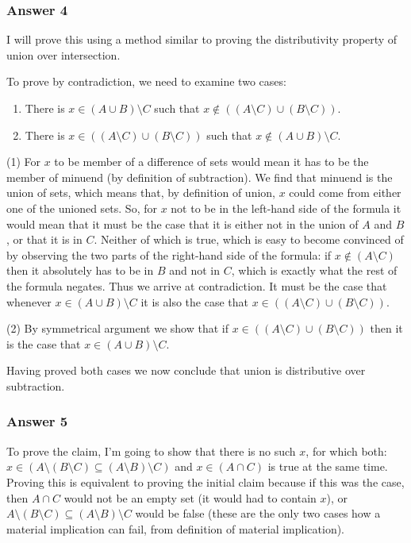 \documentclass[11pt]{article}
\begin{document}
\subsubsection{Answer 4}
\label{sec-1-2-1}
I will prove this using a method similar to proving the distributivity property of
union over intersection.

To prove by contradiction, we need to examine two cases:

\begin{enumerate}
\item There is $x \in (A \cup B) \setminus C$ such that 
       $x \not \in ((A \setminus C) \cup (B \setminus C))$.
\item There is $x \in ((A \setminus C) \cup (B \setminus C))$ such that
       $x \not \in (A \cup B) \setminus C$.
\end{enumerate}

(1) For $x$ to be member of a difference of sets would mean it has to be the
member of minuend (by definition of subtraction).  We find that minuend is
the union of sets, which means that, by definition of union, $x$ could come
from either one of the unioned sets.  So, for $x$ not to be in the left-hand side
of the formula it would mean that it must be the case that it is either not in
the union of $A$ and $B$, or that it is in $C$.  Neither of which is true, which
is easy to become convinced of by observing the two parts of the right-hand side
of the formula: if $x \not \in (A \setminus C)$ then it absolutely has to be in
$B$ and not in $C$, which is exactly what the rest of the formula negates.
Thus we arrive at contradiction.  It must be the case that whenever
$x \in (A \cup B) \setminus C$ it is also the case that
$x \in ((A \setminus C) \cup (B \setminus C))$.

(2) By symmetrical argument we show that if
$x \in ((A \setminus C) \cup (B \setminus C))$ then it is the case that
$x \in (A \cup B) \setminus C$.

Having proved both cases we now conclude that union is distributive over
subtraction.
\subsubsection{Answer 5}
\label{sec-1-2-2}
To prove the claim, I'm going to show that there is no such $x$, for which
both:
$x \in (A \setminus (B \setminus C) \subseteq (A \setminus B) \setminus C)$
and $x \in (A \cap C)$ is true at the same time.  Proving this is equivalent
to proving the initial claim because if this was the case, then $A \cap C$
would not be an empty set (it would had to contain $x$), or
$A \setminus (B \setminus C) \subseteq (A \setminus B) \setminus C$ would be
false (these are the only two cases how a material implication can fail, from
definition of material implication).
\end{document}
